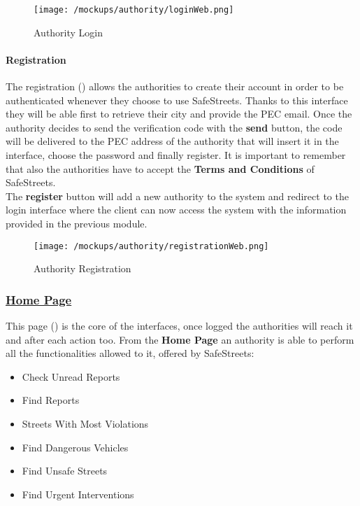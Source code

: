 				\vspace{0.6cm}
				
				\begin{figure}[ht!]
					\centering
					\texttt{[image: /mockups/authority/loginWeb.png]}
					\caption{\label{fig:loginWeb} Authority Login}
				\end{figure}
			
				\paragraph{Registration}
				The registration () allows the authorities to create their account in order to be authenticated whenever they choose to use SafeStreets. Thanks to this interface they will be able first to retrieve their city and provide the PEC email. Once the authority decides to send the verification code with the \textbf{send} button, the code will be delivered to the PEC address of the authority that will insert it in the interface, choose the password and finally register. It is important to remember that also the authorities have to accept the \textbf{Terms and Conditions} of SafeStreets.\\
				
				The \textbf{register} button will add a new authority to the system and redirect to the login interface where the client can now access the system with the information provided in the previous module.
				
				\newpage
				
				\begin{figure}[ht!]
					\centering
					\texttt{[image: /mockups/authority/registrationWeb.png]}
					\caption{\label{fig:registrationWeb} Authority Registration}
				\end{figure}
			
			\subsubsection[Home Page]{\hyperlink{toc}{Home Page}}
				\label{sec:authorityHomePage}
				
				This page () is the core of the interfaces, once logged the authorities will reach it and after each action too. From the \textbf{Home Page} an authority is able to perform all the functionalities allowed to it, offered by SafeStreets:
				
				\begin{itemize}
					\item Check Unread Reports
					\item Find Reports
					\item Streets With Most Violations
					\item Find Dangerous Vehicles
					\item Find Unsafe Streets
					\item Find Urgent Interventions
				\end{itemize}
			
